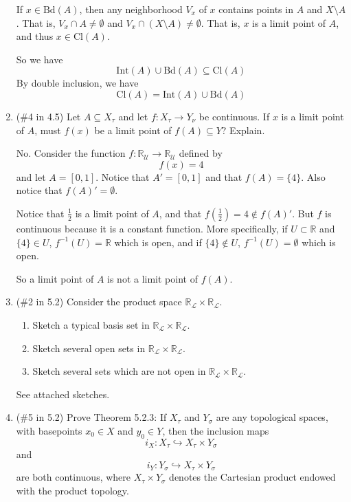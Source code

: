 \documentclass[12pt]{article}
\begin{document}
\begin{enumerate}
If $x \in \text{Bd}(A)$, then any neighborhood $V_x$ of $x$ contains points in $A$ and $X \setminus A$. That is, $V_x \cap A \neq \emptyset$ and $V_x \cap (X \setminus A) \neq \emptyset$. That is, $x$ is a limit point of $A$, and thus $x \in \text{Cl}(A)$.

So we have
\[\text{Int}(A) \cup \text{Bd}(A) \subseteq \text{Cl}(A)\]
By double inclusion, we have
\[\text{Cl}(A) = \text{Int}(A) \cup \text{Bd}(A)\]


\item (\#4 in 4.5) Let $A\subseteq X_{\tau}$ and let $f:X_{\tau} \to Y_{\nu}$ be continuous. If $x$ is a limit point of $A$, must $f(x)$ be a limit point of $f(A)\subseteq Y$? Explain.

No. Consider the function $f : \mathbb{R}_{\mathcal{U}} \to \mathbb{R}_{\mathcal{U}}$ defined by 
\[f(x) = 4\]
and let $A = [0,1]$. Notice that $A' = [0,1]$ and that $f(A) = \{4\}$. Also notice that $f(A)' = \emptyset$.

Notice that $\frac{1}{2}$ is a limit point of $A$, and that $f(\frac{1}{2}) = 4 \notin f(A)'$. But $f$ is continuous because it is a constant function. More specifically, if $U \subset \mathbb{R}$ and $\{4\} \in U$, $f^{-1}(U) = \mathbb{R}$ which is open, and if $\{4\} \notin U$, $f^{-1}(U) = \emptyset$ which is open. 

So a limit point of $A$ is not a limit point of $f(A)$. 

\item (\#2 in 5.2) Consider the product space $\mathbb{R}_{\mathcal{L}}\times \mathbb{R}_{\mathcal{L}}$.
\begin{enumerate}
\item Sketch a typical basis set in $\mathbb{R}_{\mathcal{L}}\times \mathbb{R}_{\mathcal{L}}$.
\item Sketch several open sets in $\mathbb{R}_{\mathcal{L}}\times \mathbb{R}_{\mathcal{L}}$.
\item Sketch several sets which are not open in $\mathbb{R}_{\mathcal{L}}\times \mathbb{R}_{\mathcal{L}}$.
\end{enumerate}

See attached sketches.

\item (\#5 in 5.2) Prove Theorem 5.2.3: If $X_{\tau}$ and $Y_{\sigma}$ are any topological spaces, with basepoints $x_0\in X$ and $y_0\in Y$, then the inclusion maps $$i_X:X_{\tau}\hookrightarrow X_{\tau}\times Y_{\sigma}$$ and $$i_Y:Y_{\sigma}\hookrightarrow X_{\tau}\times Y_{\sigma}$$ are both continuous, where $X_{\tau}\times Y_{\sigma}$ denotes the Cartesian product endowed with the product topology.


\end{enumerate}
\end{document}
